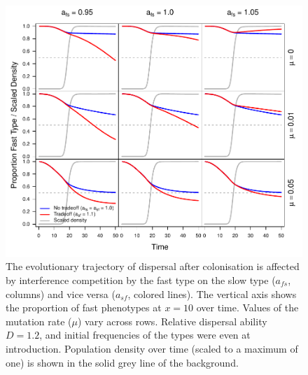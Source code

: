 \documentclass[11pt]{article}
\begin{document}
\newpage
\begin{figure}[!ht]
\begin{center}
\includegraphics[width=6.5in]{../output/time_asf.pdf}
\end{center}
\caption{
The evolutionary trajectory of dispersal after colonisation is affected by interference competition by the fast type on the slow type ($a_{fs}$, columns) and vice versa ($a_{sf}$, colored lines). The vertical axis shows the proportion of fast phenotypes at $x=10$ over time. Values of the mutation rate ($\mu$) vary across rows. Relative dispersal ability $D=1.2$, and initial frequencies of the types were even at introduction. Population density over time (scaled to a maximum of one) is shown in the solid grey line of the background. 
}
\label{ftime_asf}
\end{figure}
\end{document}
